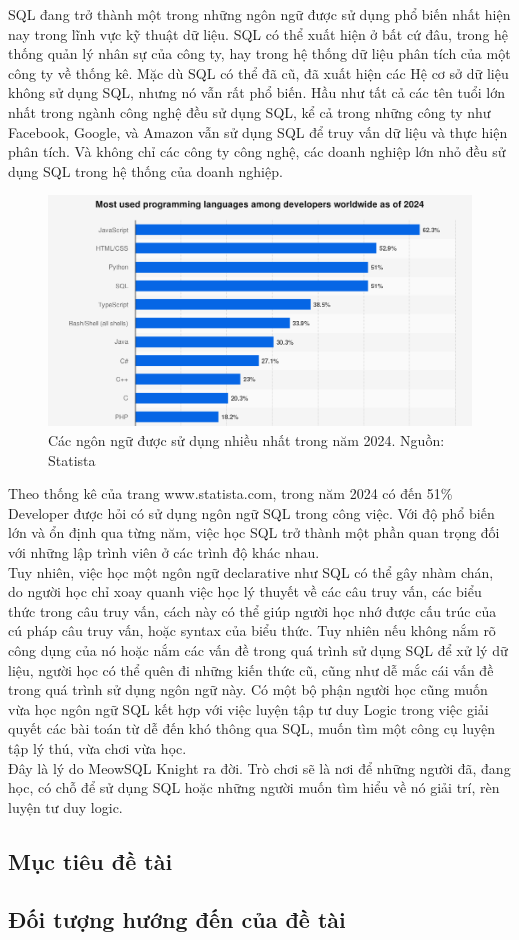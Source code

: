 \hspace*{1cm}SQL đang trở thành một trong những ngôn ngữ được sử dụng phổ biến nhất hiện nay trong lĩnh vực kỹ thuật dữ liệu. SQL có thể xuất hiện ở bất cứ đâu, trong hệ thống quản lý nhân sự của công ty, hay trong hệ thống dữ liệu phân tích của một công ty về thống kê. Mặc dù SQL có thể đã cũ, đã xuất hiện các Hệ cơ sở dữ liệu không sử dụng SQL, nhưng nó vẫn rất phổ biến. Hầu như tất cả các tên tuổi lớn nhất trong ngành công nghệ đều sử dụng SQL, kể cả trong những công ty như Facebook, Google, và Amazon vẫn sử dụng SQL để truy vấn dữ liệu và thực hiện phân tích. Và không chỉ các công ty công nghệ, các doanh nghiệp lớn nhỏ đều sử dụng SQL trong hệ thống của doanh nghiệp.\\
\begin{figure}[H]
	\centering
	\includegraphics[width=\textwidth]{Images/StatsMostLanguage.png}
	\vspace{0.5cm}
	\caption{Các ngôn ngữ được sử dụng nhiều nhất trong năm 2024. Nguồn: Statista}
\end{figure}


\hspace*{1cm}Theo thống kê của trang www.statista.com, trong năm 2024 có đến 51\% Developer được hỏi có sử dụng ngôn ngữ SQL trong công việc. Với độ phổ biến lớn và ổn định qua từng năm, việc học SQL trở thành một phần quan trọng đối với những lập trình viên ở các trình độ khác nhau.\\
Tuy nhiên, việc học một ngôn ngữ declarative như SQL có thể gây nhàm chán, do người học chỉ xoay quanh việc học lý thuyết về các câu truy vấn, các biểu thức trong câu truy vấn, cách này có thể giúp người học nhớ được cấu trúc của cú pháp câu truy vấn, hoặc syntax của biểu thức. Tuy nhiên nếu không nắm rõ công dụng của nó hoặc nắm các vấn đề trong quá trình sử dụng SQL để xử lý dữ liệu, người học có thể quên đi những kiến thức cũ, cũng như dễ mắc cái vấn đề trong quá trình sử dụng ngôn ngữ này. Có một bộ phận người học cũng muốn vừa học ngôn ngữ SQL kết hợp với việc luyện tập tư duy Logic trong việc giải quyết các bài toán từ dễ đến khó thông qua SQL, muốn tìm một công cụ luyện tập lý thú, vừa chơi vừa học.\\

\hspace*{1cm} Đây là lý do MeowSQL Knight ra đời. Trò chơi sẽ là nơi để những người đã, đang học, có chỗ để sử dụng SQL hoặc những người muốn tìm hiểu về nó giải trí, rèn luyện tư duy logic.
\subsection{Mục tiêu đề tài}
\subsection{Đối tượng hướng đến của đề tài}